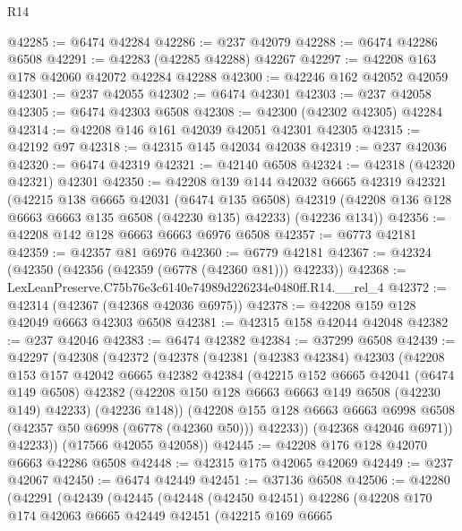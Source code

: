 \begin{lexlean}{R14}
\begin{coremodule}
@42285 := @6474 @42284
@42286 := @237 @42079
@42288 := @6474 @42286 @6508
@42291 := @42283 (@42285 @42288) @42267
@42297 := @42208 @163 @178 @42060 @42072 @42284 @42288
@42300 := @42246 @162 @42052 @42059
@42301 := @237 @42055
@42302 := @6474 @42301
@42303 := @237 @42058
@42305 := @6474 @42303 @6508
@42308 := @42300 (@42302 @42305) @42284
@42314 := @42208 @146 @161 @42039 @42051 @42301 @42305
@42315 := @42192 @97
@42318 := @42315 @145 @42034 @42038
@42319 := @237 @42036
@42320 := @6474 @42319
@42321 := @42140 @6508
@42324 := @42318 (@42320 @42321) @42301
@42350 := @42208
    @139
    @144
    @42032
    @6665
    @42319
    @42321
    (@42215
      @138
      @6665
      @42031
      (@6474 @135 @6508)
      @42319
      (@42208 @136 @128 @6663 @6663 @135 @6508 (@42230 @135) @42233)
      (@42236 @134))
@42356 := @42208 @142 @128 @6663 @6663 @6976 @6508
@42357 := @6773 @42181
@42359 := @42357 @81 @6976
@42360 := @6779 @42181
@42367 := @42324 (@42350 (@42356 (@42359 (@6778 (@42360 @81))) @42233))
@42368 := LexLeanPreserve.C75b76e3c6140e74989d226234e0480ff.R14.__rel_4
@42372 := @42314 (@42367 (@42368 @42036 @6975))
@42378 := @42208 @159 @128 @42049 @6663 @42303 @6508
@42381 := @42315 @158 @42044 @42048
@42382 := @237 @42046
@42383 := @6474 @42382
@42384 := @37299 @6508
@42439 := @42297
    (@42308
      (@42372
        (@42378
          (@42381
            (@42383 @42384)
            @42303
            (@42208
              @153
              @157
              @42042
              @6665
              @42382
              @42384
              (@42215
                @152
                @6665
                @42041
                (@6474 @149 @6508)
                @42382
                (@42208 @150 @128 @6663 @6663 @149 @6508 (@42230 @149) @42233)
                (@42236 @148))
              (@42208
                @155
                @128
                @6663
                @6663
                @6998
                @6508
                (@42357 @50 @6998 (@6778 (@42360 @50)))
                @42233))
            (@42368 @42046 @6971))
          @42233))
      (@17566 @42055 @42058))
@42445 := @42208 @176 @128 @42070 @6663 @42286 @6508
@42448 := @42315 @175 @42065 @42069
@42449 := @237 @42067
@42450 := @6474 @42449
@42451 := @37136 @6508
@42506 := @42280
    (@42291
      (@42439
        (@42445
          (@42448
            (@42450 @42451)
            @42286
            (@42208
              @170
              @174
              @42063
              @6665
              @42449
              @42451
              (@42215
                @169
                @6665

\end{coremodule}
\end{lexlean}

